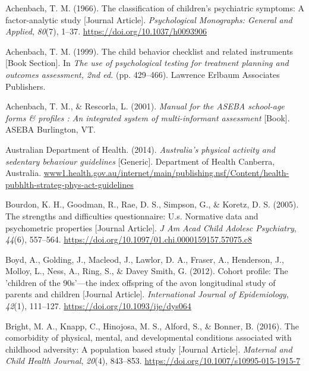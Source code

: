 \documentclass[
  letterpaper,
  DIV=11,
  numbers=noendperiod]{scrreport}
\newlength{\cslhangindent}
\newenvironment{CSLReferences}[2] %
 {\begin{list}{}{%
  \setlength{\itemindent}{0pt}
  \setlength{\leftmargin}{0pt}
  \setlength{\parsep}{0pt}
  \ifodd #1
   \setlength{\leftmargin}{\cslhangindent}
   \setlength{\itemindent}{-1\cslhangindent}
  \fi
  \setlength{\itemsep}{#2\baselineskip}}}
 {\end{list}}
\begin{document}
\label{refs--3}
\begin{CSLReferences}{1}{0}
Achenbach, T. M. (1966). The classification of children's psychiatric
symptoms: A factor-analytic study {[}Journal Article{]}.
\emph{Psychological Monographs: General and Applied}, \emph{80}(7),
1--37. \url{https://doi.org/10.1037/h0093906}

Achenbach, T. M. (1999). The child behavior checklist and related
instruments {[}Book Section{]}. In \emph{The use of psychological
testing for treatment planning and outcomes assessment, 2nd ed.} (pp.
429--466). Lawrence Erlbaum Associates Publishers.

Achenbach, T. M., \& Rescorla, L. (2001). \emph{Manual for the ASEBA
school-age forms \& profiles : An integrated system of multi-informant
assessment} {[}Book{]}. ASEBA Burlington, VT.

Australian Department of Health. (2014). \emph{Australia's physical
activity and sedentary behaviour guidelines} {[}Generic{]}. Department
of Health Canberra, Australia.
\href{https://www1.health.gov.au/internet/main/publishing.nsf/Content/health-pubhlth-strateg-phys-act-guidelines}{www1.health.gov.au/internet/main/publishing.nsf/Content/health-pubhlth-strateg-phys-act-guidelines}

Bourdon, K. H., Goodman, R., Rae, D. S., Simpson, G., \& Koretz, D. S.
(2005). The strengths and difficulties questionnaire: U.s. Normative
data and psychometric properties {[}Journal Article{]}. \emph{J Am Acad
Child Adolesc Psychiatry}, \emph{44}(6), 557--564.
\url{https://doi.org/10.1097/01.chi.0000159157.57075.c8}

Boyd, A., Golding, J., Macleod, J., Lawlor, D. A., Fraser, A.,
Henderson, J., Molloy, L., Ness, A., Ring, S., \& Davey Smith, G.
(2012). Cohort profile: The 'children of the 90s'---the index offspring
of the avon longitudinal study of parents and children {[}Journal
Article{]}. \emph{International Journal of Epidemiology}, \emph{42}(1),
111--127. \url{https://doi.org/10.1093/ije/dys064}

Bright, M. A., Knapp, C., Hinojosa, M. S., Alford, S., \& Bonner, B.
(2016). The comorbidity of physical, mental, and developmental
conditions associated with childhood adversity: A population based study
{[}Journal Article{]}. \emph{Maternal and Child Health Journal},
\emph{20}(4), 843--853. \url{https://doi.org/10.1007/s10995-015-1915-7}


\end{CSLReferences}
\end{document}

